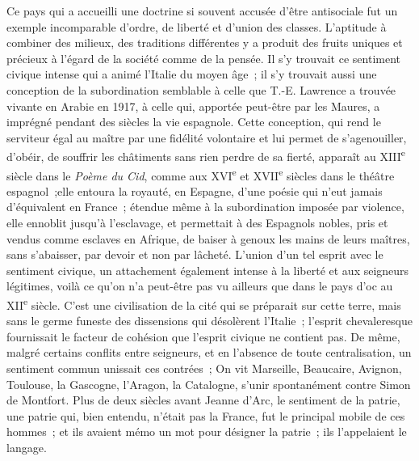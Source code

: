 \documentclass[french,twoside]{book} %
\begin{document}
Ce pays qui a accueilli une doctrine si souvent accusée d'être antisociale fut un exemple incomparable d'ordre, de liberté et d'union des classes. L'apti­tude à combiner des milieux, des traditions différentes y a produit des fruits uniques et précieux à l'égard de la société comme de la pensée. Il s'y trouvait ce sentiment civique intense qui a animé l'Italie du moyen âge ; il s'y trouvait aussi une conception de la subordination semblable à celle que T.-E. Lawrence a trouvée vivante en Arabie en 1917, à celle qui, apportée peut-être par les Maures, a imprégné pendant des siècles la vie espagnole. Cette conception, qui rend le serviteur égal au maître par une fidélité volontaire et lui permet de s'agenouiller, d'obéir, de souffrir les châtiments sans rien perdre de sa fierté, apparaît au XIII\textsuperscript{e} siècle dans le {\itshape Poème du Cid}, comme aux XVI\textsuperscript{e} et XVII\textsuperscript{e} siècles dans le théâtre espagnol ;elle entoura la royauté, en Espagne, d'une poésie qui n'eut jamais d'équivalent en France ; étendue même à la subordination imposée par violence, elle ennoblit jusqu'à l'esclavage, et permettait à des Espagnols nobles, pris et vendus comme esclaves en Afrique, de baiser à genoux les mains de leurs maîtres, sans s'abaisser, par devoir et non par lâcheté. L'union d'un tel esprit avec le sentiment civique, un attache­ment également intense à la liberté et aux seigneurs légitimes, voilà ce qu'on n'a peut-être pas vu ailleurs que dans le pays d'oc au XII\textsuperscript{e} siècle. C'est une civilisation de la cité qui se préparait sur cette terre, mais sans le germe funeste des dissensions qui désolèrent l'Italie ; l'esprit chevaleresque fournis­sait le facteur de cohésion que l'esprit civique ne contient pas. De même, malgré certains conflits entre seigneurs, et en l'absence de toute centralisation, un sentiment commun unissait ces contrées ; On vit Marseille, Beaucaire, Avignon, Toulouse, la Gascogne, l'Aragon, la Catalogne, s'unir spontanément contre Simon de Montfort. Plus de deux siècles avant Jeanne d'Arc, le sentiment de la patrie, une patrie qui, bien entendu, n'était pas la France, fut le principal mobile de ces hommes ; et ils avaient mémo un mot pour désigner la patrie ; ils l'appelaient le langage.\par
\end{document}
